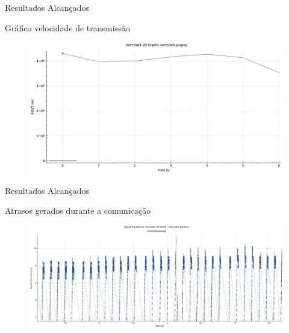 \documentclass[10pt]{beamer}
\begin{document}
\begin{frame}{Resultados Alcançados}
	\begin{alertblock}{Gráfico velocidade de transmissão}
		\vspace{0.8cm}
		\begin{figure}[h]
			\begin{center}
				\includegraphics[scale=0.3]{imagens/speed.jpg}\\
			\end{center}
			\label{fig:speed}
		\end{figure}
	\end{alertblock}
\end{frame}

\begin{frame}{Resultados Alcançados}
	\begin{alertblock}{Atrasos gerados durante a comunicação}
		\vspace{0.8cm}
		\begin{figure}[h]
			\begin{center}
				\includegraphics[scale=0.23]{imagens/delay.jpg}\\
			\end{center}
			\label{fig:delay}
		\end{figure}
	\end{alertblock}
\end{frame}
\end{document}
